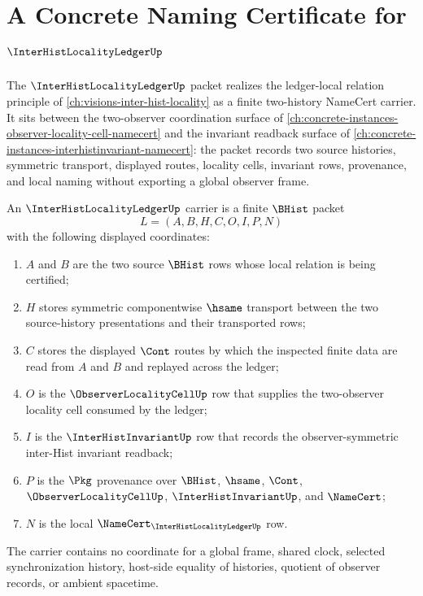 \chapter{A Concrete Naming Certificate for $\InterHistLocalityLedgerUp$}
\label{ch:concrete-instances-inter-hist-locality-ledger-namecert}

The $\InterHistLocalityLedgerUp$ packet realizes the ledger-local relation principle of \autoref{ch:visions-inter-hist-locality} as a finite two-history NameCert carrier. It sits between the two-observer coordination surface of \autoref{ch:concrete-instances-observer-locality-cell-namecert} and the invariant readback surface of \autoref{ch:concrete-instances-interhistinvariant-namecert}: the packet records two source histories, symmetric transport, displayed routes, locality cells, invariant rows, provenance, and local naming without exporting a global observer frame.

\begin{definition}
\label{def:inter-hist-locality-ledger-carrier}
An $\InterHistLocalityLedgerUp$ carrier is a finite $\BHist$ packet
$$
L=(A,B,H,C,O,I,P,N)
$$
with the following displayed coordinates:
\begin{enumerate}
\item $A$ and $B$ are the two source $\BHist$ rows whose local relation is being certified;
\item $H$ stores symmetric componentwise $\hsame$ transport between the two source-history presentations and their transported rows;
\item $C$ stores the displayed $\Cont$ routes by which the inspected finite data are read from $A$ and $B$ and replayed across the ledger;
\item $O$ is the $\ObserverLocalityCellUp$ row that supplies the two-observer locality cell consumed by the ledger;
\item $I$ is the $\InterHistInvariantUp$ row that records the observer-symmetric inter-Hist invariant readback;
\item $P$ is the $\Pkg$ provenance over $\BHist$, $\hsame$, $\Cont$, $\ObserverLocalityCellUp$, $\InterHistInvariantUp$, and $\NameCert$;
\item $N$ is the local $\NameCert_{\InterHistLocalityLedgerUp}$ row.
\end{enumerate}
The carrier contains no coordinate for a global frame, shared clock, selected synchronization history, host-side equality of histories, quotient of observer records, or ambient spacetime.
\end{definition}

